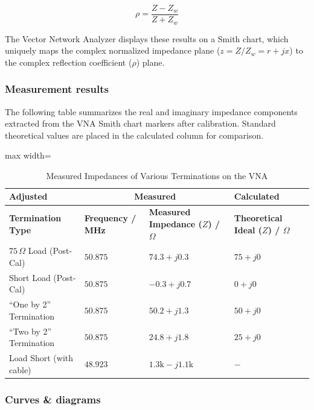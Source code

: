 \begin{equation}
    \rho = \frac{Z - Z_w}{Z + Z_w}
\end{equation}

The Vector Network Analyzer displays these results on a Smith chart, which uniquely maps the complex normalized impedance plane ($z = Z / Z_w = r + jx$) to the complex reflection coefficient ($\rho$) plane.
\newpage
\subsubsection{Measurement results}

The following table summarizes the real and imaginary impedance components extracted from the VNA Smith chart markers after calibration. Standard theoretical values are placed in the calculated column for comparison.

\begin{table}[htbp]
    \centering
    \begin{adjustbox}{max width=\textwidth}
    \begin{tabular}{|l|l|l|l|}
        \hline
        \textbf{Adjusted} & \multicolumn{2}{c|}{\textbf{Measured}} & \textbf{Calculated} \\ \hline
        \textbf{Termination Type} & \textbf{Frequency / MHz} & \textbf{Measured Impedance ($Z$) / $\Omega$} & \textbf{Theoretical Ideal ($Z$) / $\Omega$} \\ \hline
        $75\,\Omega$ Load (Post-Cal) & $50.875$ & $74.3 + j0.3$ & $75 + j0$ \\ \hline
        Short Load (Post-Cal) & $50.875$ & $-0.3 + j0.7$ & $0 + j0$ \\ \hline
        ``One by 2'' Termination & $50.875$ & $50.2 + j1.3$ & $50 + j0$ \\ \hline
        ``Two by 2'' Termination & $50.875$ & $24.8 + j1.8$ & $25 + j0$ \\ \hline
        Load Short (with cable) & $48.923$ & $1.3\text{k} - j1.1\text{k}$ & $-$ \\ \hline
    \end{tabular}
    \end{adjustbox}
    \caption{Measured Impedances of Various Terminations on the VNA}
    \label{tab:vna_terminations}
\end{table}

\subsubsection{Curves \& diagrams}

